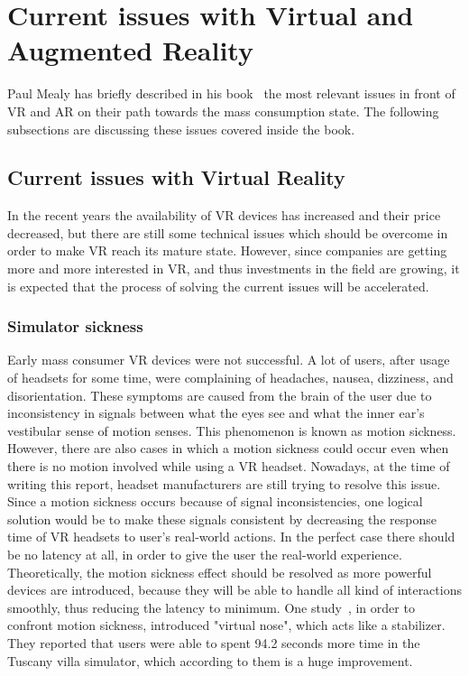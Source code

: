 \documentclass[12pt]{article}
\begin{document}
\section{Current issues with Virtual and Augmented Reality}\label{sec:Current issues with Virtual and Augmented Reality}

Paul Mealy has briefly described in his book~\cite{dummies} the most relevant issues in front of \ac{VR} and \ac{AR} on their path towards the mass consumption state. The following subsections are discussing these issues covered inside the book. 

\subsection{Current issues with Virtual Reality}\label{sec:Current issues with Virtual Reality}
In the recent years the availability of \ac{VR} devices has increased and their price decreased, but there are still some technical issues which should be overcome in order to make \ac{VR} reach its mature state. However, since companies are getting more and more interested in \ac{VR}, and thus investments in the field are growing, it is expected that the process of solving the current issues will be accelerated.

\subsubsection{Simulator sickness} \label{sec:Simulator sickness}
Early mass consumer \ac{VR} devices were not successful. A lot of users, after usage of headsets for some time, were complaining of headaches, nausea, dizziness, and disorientation. These symptoms are caused from the brain of the user due to inconsistency in signals between what the eyes see and what the inner ear's vestibular sense of motion senses. This phenomenon is known as motion sickness. However, there are also cases in which a motion sickness could occur even when there is no motion involved while using a \ac{VR} headset. Nowadays, at the time of writing this report, headset manufacturers are still trying to resolve this issue. Since a motion sickness occurs because of signal inconsistencies, one logical solution would be to make these signals consistent by decreasing the response time of VR headsets to user's real-world actions. In the perfect case there should be no latency at all, in order to give the user the real-world experience. Theoretically, the motion sickness effect should be resolved as more powerful devices are introduced, because they will be able to handle all kind of interactions smoothly, thus reducing the latency to minimum. One study~\cite{nasumVirtualis}, in order to confront motion sickness, introduced "virtual nose", which acts like a stabilizer. They reported that users were able to spent 94.2 seconds more time in the Tuscany villa simulator, which according to them is a huge improvement.
\end{document}
